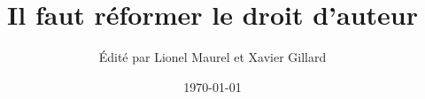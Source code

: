 \documentclass[11pt,liststotoc,bibtotoc]{scrbook}
\title{Il faut réformer le droit d'auteur}
\author{Édité par Lionel Maurel et Xavier Gillard}
\date{\today}
\theoremstyle{break}
\begin{document}
\renewcommand{\labelitemi}{$\bullet$}

\maketitle




\tableofcontents











\appendix


\end{document}
